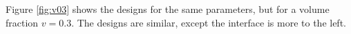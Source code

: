 \documentclass[11pt]{article}
\begin{document}

Figure \ref{fig:v03} shows the designs for the same parameters, but for a volume fraction $v=0.3$.  The designs are similar, except the interface is more to the left.

\end{document}
